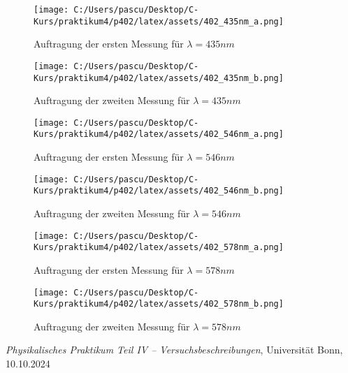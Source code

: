 \documentclass{article}
\begin{document}
\begin{figure}[h!]
  \centering
  \texttt{[image: C:/Users/pascu/Desktop/C-Kurs/praktikum4/p402/latex/assets/402\_435nm\_a.png]}
  \caption{Auftragung der ersten Messung für $ \lambda =435nm$}
  \label{fig:wellenlaenge_435nm_a}
\end{figure}

\begin{figure}[h!]
  \centering
  \texttt{[image: C:/Users/pascu/Desktop/C-Kurs/praktikum4/p402/latex/assets/402\_435nm\_b.png]}
  \caption{Auftragung der zweiten Messung für $\lambda =435nm$}
  \label{fig:wellenlaenge_435nm_b}
\end{figure}

\begin{figure}[h!]
  \centering
  \texttt{[image: C:/Users/pascu/Desktop/C-Kurs/praktikum4/p402/latex/assets/402\_546nm\_a.png]}
  \caption{Auftragung der ersten Messung für $ \lambda =546nm$}
  \label{fig:wellenlaenge_546nm_a}
\end{figure}

\begin{figure}[h!]
  \centering
  \texttt{[image: C:/Users/pascu/Desktop/C-Kurs/praktikum4/p402/latex/assets/402\_546nm\_b.png]}
  \caption{Auftragung der zweiten Messung für $\lambda =546nm$}
  \label{fig:wellenlaenge_546nm_b}
\end{figure}

\begin{figure}[h!]
  \centering
  \texttt{[image: C:/Users/pascu/Desktop/C-Kurs/praktikum4/p402/latex/assets/402\_578nm\_a.png]}
  \caption{Auftragung der ersten Messung für $ \lambda =578nm$}
  \label{fig:wellenlaenge_578nm_a}
\end{figure}

\begin{figure}[h!]
  \centering
  \texttt{[image: C:/Users/pascu/Desktop/C-Kurs/praktikum4/p402/latex/assets/402\_578nm\_b.png]}
  \caption{Auftragung der zweiten Messung für $\lambda =578nm$}
  \label{fig:wellenlaenge_578nm_b}
\end{figure}


\clearpage
\begin{thebibliography}{9}

\textit{Physikalisches Praktikum Teil IV -- Versuchsbeschreibungen}, Universität Bonn, 10.10.2024


\end{thebibliography}
\end{document}
